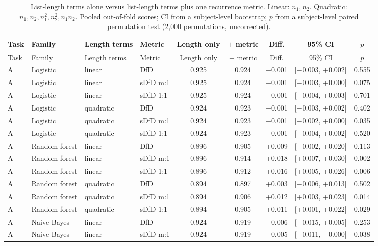 \begin{longtable}{llllccccc}
\caption{List-length terms alone versus list-length terms plus one recurrence metric. Linear: $n_1, n_2$. Quadratic: $n_1, n_2, n_1^2, n_2^2, n_1 n_2$. Pooled out-of-fold scores; CI from a subject-level bootstrap; $p$ from a subject-level paired permutation test (2{,}000 permutations, uncorrected).}\label{tab:supp_length_added}\\
\toprule
Task & Family & Length terms & Metric & Length only & $+$ metric & Diff. & 95\% CI & $p$ \\
\midrule
\endfirsthead
\toprule
Task & Family & Length terms & Metric & Length only & $+$ metric & Diff. & 95\% CI & $p$ \\
\midrule
\endhead
A & Logistic & linear & DfD & 0.925 & 0.924 & $-$0.001 & [$-$0.003, +0.002] & 0.555 \\
A & Logistic & linear & sDfD m:1 & 0.925 & 0.924 & $-$0.001 & [$-$0.003, +0.000] & 0.075 \\
A & Logistic & linear & sDfD 1:1 & 0.925 & 0.924 & $-$0.001 & [$-$0.004, +0.003] & 0.701 \\
A & Logistic & quadratic & DfD & 0.924 & 0.923 & $-$0.001 & [$-$0.003, +0.002] & 0.402 \\
A & Logistic & quadratic & sDfD m:1 & 0.924 & 0.923 & $-$0.001 & [$-$0.002, +0.000] & 0.035 \\
A & Logistic & quadratic & sDfD 1:1 & 0.924 & 0.923 & $-$0.001 & [$-$0.004, +0.002] & 0.520 \\
A & Random forest & linear & DfD & 0.896 & 0.905 & +0.009 & [$-$0.002, +0.020] & 0.113 \\
A & Random forest & linear & sDfD m:1 & 0.896 & 0.914 & +0.018 & [+0.007, +0.030] & 0.002 \\
A & Random forest & linear & sDfD 1:1 & 0.896 & 0.912 & +0.016 & [+0.005, +0.026] & 0.006 \\
A & Random forest & quadratic & DfD & 0.894 & 0.897 & +0.003 & [$-$0.006, +0.013] & 0.502 \\
A & Random forest & quadratic & sDfD m:1 & 0.894 & 0.906 & +0.012 & [+0.003, +0.023] & 0.014 \\
A & Random forest & quadratic & sDfD 1:1 & 0.894 & 0.905 & +0.011 & [+0.001, +0.022] & 0.029 \\
A & Naive Bayes & linear & DfD & 0.924 & 0.919 & $-$0.006 & [$-$0.015, +0.005] & 0.253 \\
A & Naive Bayes & linear & sDfD m:1 & 0.924 & 0.919 & $-$0.005 & [$-$0.011, $-$0.000] & 0.038 \\

\end{longtable}
